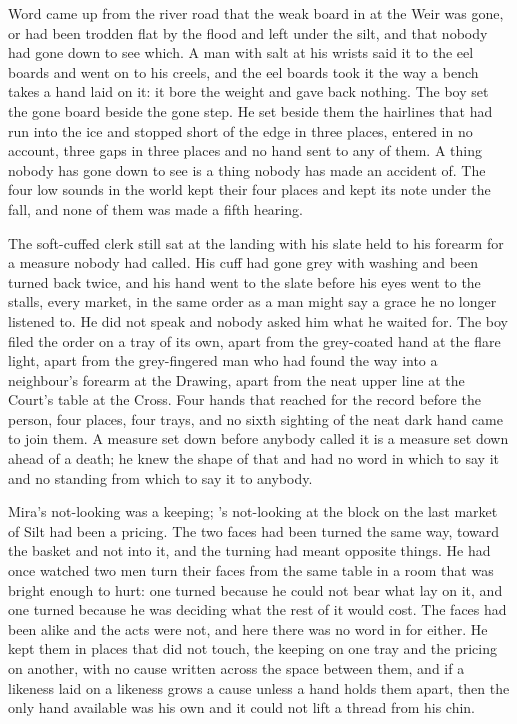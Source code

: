 Word came up from the river road that the weak board in  at the Weir was gone, or had been trodden flat by the flood and left under the silt, and that nobody had gone down to see which. A man with salt at his wrists said it to the eel boards and went on to his creels, and the eel boards took it the way a bench takes a hand laid on it: it bore the weight and gave back nothing. The boy set the gone board beside the gone step. He set beside them the hairlines that had run into the ice and stopped short of the edge in three places, entered in no account, three gaps in three places and no hand sent to any of them. A thing nobody has gone down to see is a thing nobody has made an accident of. The four low sounds in the world kept their four places and  kept its note under the fall, and none of them was made a fifth hearing.

The soft-cuffed clerk still sat at the landing with his slate held to his forearm for a measure nobody had called. His cuff had gone grey with washing and been turned back twice, and his hand went to the slate before his eyes went to the stalls, every market, in the same order as a man might say a grace he no longer listened to. He did not speak and nobody asked him what he waited for. The boy filed the order on a tray of its own, apart from the grey-coated hand at the flare light, apart from the grey-fingered man who had found the way into a neighbour's forearm at the Drawing, apart from the neat upper line at the Court's table at the Cross. Four hands that reached for the record before the person, four places, four trays, and no sixth sighting of the neat dark hand came to join them. A measure set down before anybody called it is a measure set down ahead of a death; he knew the shape of that and had no word in which to say it and no standing from which to say it to anybody.

\scenebreak

Mira's not-looking was a keeping; 's not-looking at the block on the last market of Silt had been a pricing. The two faces had been turned the same way, toward the basket and not into it, and the turning had meant opposite things. He had once watched two men turn their faces from the same table in a room that was bright enough to hurt: one turned because he could not bear what lay on it, and one turned because he was deciding what the rest of it would cost. The faces had been alike and the acts were not, and here there was no word in  for either. He kept them in places that did not touch, the keeping on one tray and the pricing on another, with no cause written across the space between them, and if a likeness laid on a likeness grows a cause unless a hand holds them apart, then the only hand available was his own and it could not lift a thread from his chin.

